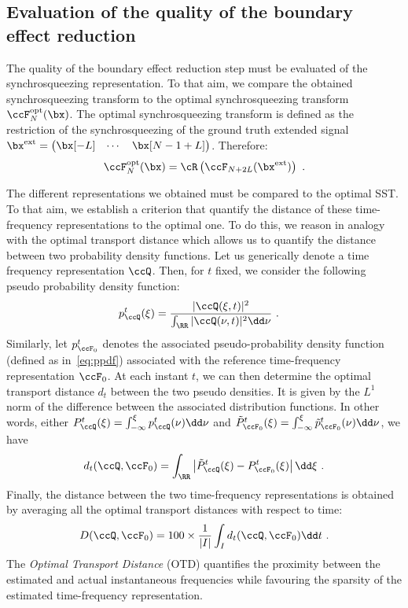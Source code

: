 \subsection{Evaluation of the quality of the boundary effect reduction}
The quality of the boundary effect reduction step must be evaluated of the synchrosqueezing representation. To that aim, we compare the obtained synchrosqueezing transform to the optimal synchrosqueezing transform $\ccF_N^\mathrm{opt}(\bx)$. The optimal synchrosqueezing transform is defined as the restriction of the synchrosqueezing of the ground truth extended signal $\bx^\mathrm{ext} = \begin{pmatrix}\bx[-L] & \cdots & \bx[N-1+L] \end{pmatrix}$. Therefore:
\begin{equation*}
\ccF_N^\mathrm{opt}(\bx) = \cR\left( \ccF_{N+2L}(\bx^\mathrm{ext}) \right) \ .
\end{equation*} 

The different representations we obtained must be compared to the optimal SST. To that aim, we establish a criterion that quantify the distance of these time-frequency representations to the optimal one. To do this, we reason in analogy with the optimal transport distance which allows us to quantify the distance between two probability density functions. Let us generically denote a time frequency representation $\ccQ$. Then, for $t$ fixed, we consider the following pseudo probability density function:
\begin{align}
p_\ccQ^t(\xi) &= \dfrac{|\ccQ(\xi,t)|^2}{\int_\RR |\ccQ(\nu,t)|^2\dd\nu}\ .
\label{eq:ppdf}
\end{align}
Similarly, let $p_{\ccF_0}^t$ denotes the associated pseudo-probability density function (defined as in~\eqref{eq:ppdf}) associated with the reference time-frequency representation $\ccF_0$. At each instant $t$, we can then determine the optimal transport distance $d_{t}$ between the two pseudo densities. It is given by the $L^1$ norm of the difference between the associated distribution functions. In other words, either $P_{\ccQ}^t(\xi)=\int_{-\infty}^\xi p_{\ccQ}^t(\nu)\dd\nu$ and $\tilde P_{\ccF_0}^t(\xi)=\int_{-\infty}^\xi\tilde p_{\ccF_0}^t(\nu)\dd\nu$, we have
\begin{equation*}
d_{t}(\ccQ,\ccF_0) = \int_\RR\left|\tilde P_{\ccQ}^t(\xi)-  P_{\ccF_0}^t(\xi)\right|\dd\xi\ .
\end{equation*}
Finally, the distance between the two time-frequency representations is obtained by averaging all the optimal transport distances with respect to time:
\begin{equation}
D(\ccQ,\ccF_0) = 100\times\frac1{|I|}\int_I d_{t}(\ccQ,\ccF_0)\dd t\ .
\end{equation}
The \textit{Optimal Transport Distance} (OTD) quantifies the proximity between the estimated and actual instantaneous frequencies while favouring the sparsity of the estimated time-frequency representation.

